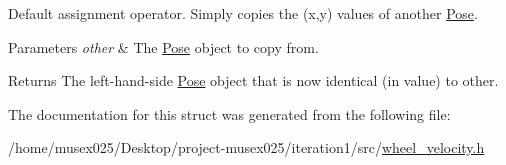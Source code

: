 Default assignment operator. Simply copies the (x,y) values of another \hyperlink{structPose}{Pose}. 


\begin{DoxyParams}{Parameters}
{\em other} & The \hyperlink{structPose}{Pose} object to copy from.\\
\hline
\end{DoxyParams}
\begin{DoxyReturn}{Returns}
The left-\/hand-\/side \hyperlink{structPose}{Pose} object that is now identical (in value) to {\ttfamily other}. 
\end{DoxyReturn}


The documentation for this struct was generated from the following file\+:\begin{DoxyCompactItemize}
\item 
/home/musex025/\+Desktop/project-\/musex025/iteration1/src/\hyperlink{wheel__velocity_8h}{wheel\+\_\+velocity.\+h}\end{DoxyCompactItemize}

